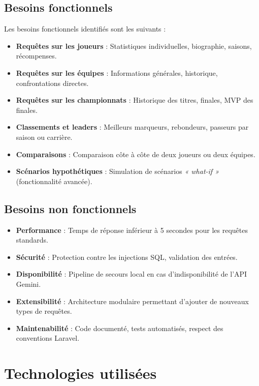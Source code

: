 \documentclass[12pt,a4paper]{report}
\begin{document}
\subsection{Besoins fonctionnels}

Les besoins fonctionnels identifiés sont les suivants :

\begin{itemize}
    \item \textbf{Requêtes sur les joueurs} : Statistiques individuelles, biographie, saisons, récompenses.
    \item \textbf{Requêtes sur les équipes} : Informations générales, historique, confrontations directes.
    \item \textbf{Requêtes sur les championnats} : Historique des titres, finales, MVP des finales.
    \item \textbf{Classements et leaders} : Meilleurs marqueurs, rebondeurs, passeurs par saison ou carrière.
    \item \textbf{Comparaisons} : Comparaison côte à côte de deux joueurs ou deux équipes.
    \item \textbf{Scénarios hypothétiques} : Simulation de scénarios \textit{« what-if »} (fonctionnalité avancée).
\end{itemize}

\subsection{Besoins non fonctionnels}

\begin{itemize}
    \item \textbf{Performance} : Temps de réponse inférieur à 5 secondes pour les requêtes standards.
    \item \textbf{Sécurité} : Protection contre les injections SQL, validation des entrées.
    \item \textbf{Disponibilité} : Pipeline de secours local en cas d'indisponibilité de l'API Gemini.
    \item \textbf{Extensibilité} : Architecture modulaire permettant d'ajouter de nouveaux types de requêtes.
    \item \textbf{Maintenabilité} : Code documenté, tests automatisés, respect des conventions Laravel.
\end{itemize}

\section{Technologies utilisées}
\end{document}
